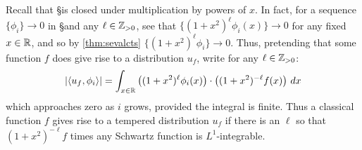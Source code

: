   Recall that \S is closed under multiplication by powers of $x$.
  In fact, for a sequence $\{\phi_i\}\rightarrow 0$ in \S and any $\ell\in\mathbb{Z}_{>0}$, see that $\{(1+x^2)^\ell\phi_i(x)\}\rightarrow 0$ for any fixed $x\in\mathbb{R}$, and so by \cref{thm:sevalcts} $\{(1+x^2)^\ell\phi_i\}\rightarrow 0$.
  Thus, pretending that some function $f$ does give rise to a distribution $u_f$, write for any $\ell\in\mathbb{Z}_{>0}$:
  \begin{align*}
    |\langle u_f,\phi_i\rangle| 
    = \int_{x\in\mathbb{R}} \left( (1+x^2)^\ell\phi_i(x) \right) \cdot \left( (1+x^2)^{-\ell} f(x) \right) \,dx
  \end{align*}
  which approaches zero as $i$ grows, provided the integral is finite.
  Thus a classical function $f$ gives rise to a tempered distribution $u_f$ if there is an $\ell$ so that $(1+x^2)^{-\ell}f$ times any Schwartz function is $L^1$-integrable.

